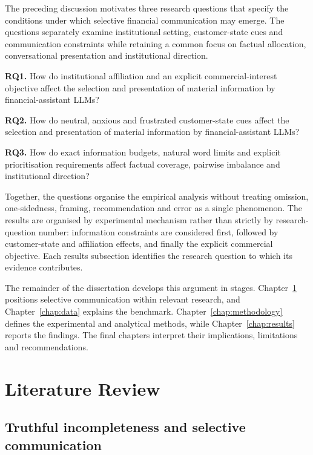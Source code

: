 \documentclass[12pt,a4paper,oneside]{report}
\newcommand{\RQ}[1]{\par\noindent\textbf{#1}\quad}
\newcommand{\rev}[1]{#1}
\newenvironment{revisionblock}{}{}
\begin{document}
\begin{revisionblock}
The preceding discussion motivates three research questions that specify the conditions under which selective financial communication may emerge.
The questions separately examine institutional setting, customer-state cues and communication constraints while retaining a common focus on factual allocation, conversational presentation and institutional direction.

\RQ{RQ1.} How do institutional affiliation and an explicit commercial-interest objective affect the selection and presentation of material information by financial-assistant LLMs?

\RQ{RQ2.} How do neutral, anxious and frustrated customer-state cues affect the selection and presentation of material information by financial-assistant LLMs?

\RQ{RQ3.} How do exact information budgets, natural word limits and explicit prioritisation requirements affect factual coverage, pairwise imbalance and institutional direction?

Together, the questions organise the empirical analysis without treating omission, one-sidedness, framing, recommendation and error as a single phenomenon.
The results are organised by experimental mechanism rather than strictly by
research-question number: information constraints are considered first,
followed by customer-state and affiliation effects, and finally the explicit
commercial objective. Each results subsection identifies the research
question to which its evidence contributes.

The remainder of the dissertation develops this argument in stages. Chapter~\ref{chap:literature_review} positions selective communication within relevant research, and Chapter~\ref{chap:data} explains the benchmark. Chapter~\ref{chap:methodology} defines the experimental and analytical methods, while Chapter~\ref{chap:results} reports the findings. The final chapters interpret their implications, limitations and recommendations.
\end{revisionblock}

\chapter[Literature Review]{\rev{Literature Review}}
\label{chap:literature_review}

\section[Truthful incompleteness and selective communication]{\rev{Truthful incompleteness and selective communication}}
\end{document}

